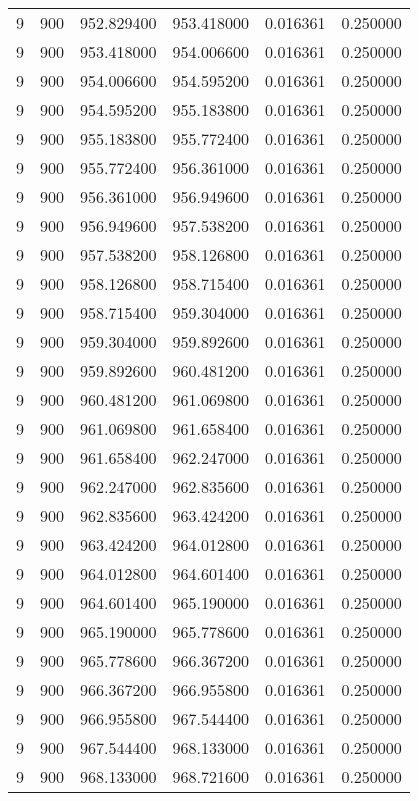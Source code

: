 \begin{longtable}{rrrrrr}
9 & 900 & 952.829400 & 953.418000 & 0.016361 & 0.250000 \\
9 & 900 & 953.418000 & 954.006600 & 0.016361 & 0.250000 \\
9 & 900 & 954.006600 & 954.595200 & 0.016361 & 0.250000 \\
9 & 900 & 954.595200 & 955.183800 & 0.016361 & 0.250000 \\
9 & 900 & 955.183800 & 955.772400 & 0.016361 & 0.250000 \\
9 & 900 & 955.772400 & 956.361000 & 0.016361 & 0.250000 \\
9 & 900 & 956.361000 & 956.949600 & 0.016361 & 0.250000 \\
9 & 900 & 956.949600 & 957.538200 & 0.016361 & 0.250000 \\
9 & 900 & 957.538200 & 958.126800 & 0.016361 & 0.250000 \\
9 & 900 & 958.126800 & 958.715400 & 0.016361 & 0.250000 \\
9 & 900 & 958.715400 & 959.304000 & 0.016361 & 0.250000 \\
9 & 900 & 959.304000 & 959.892600 & 0.016361 & 0.250000 \\
9 & 900 & 959.892600 & 960.481200 & 0.016361 & 0.250000 \\
9 & 900 & 960.481200 & 961.069800 & 0.016361 & 0.250000 \\
9 & 900 & 961.069800 & 961.658400 & 0.016361 & 0.250000 \\
9 & 900 & 961.658400 & 962.247000 & 0.016361 & 0.250000 \\
9 & 900 & 962.247000 & 962.835600 & 0.016361 & 0.250000 \\
9 & 900 & 962.835600 & 963.424200 & 0.016361 & 0.250000 \\
9 & 900 & 963.424200 & 964.012800 & 0.016361 & 0.250000 \\
9 & 900 & 964.012800 & 964.601400 & 0.016361 & 0.250000 \\
9 & 900 & 964.601400 & 965.190000 & 0.016361 & 0.250000 \\
9 & 900 & 965.190000 & 965.778600 & 0.016361 & 0.250000 \\
9 & 900 & 965.778600 & 966.367200 & 0.016361 & 0.250000 \\
9 & 900 & 966.367200 & 966.955800 & 0.016361 & 0.250000 \\
9 & 900 & 966.955800 & 967.544400 & 0.016361 & 0.250000 \\
9 & 900 & 967.544400 & 968.133000 & 0.016361 & 0.250000 \\
9 & 900 & 968.133000 & 968.721600 & 0.016361 & 0.250000 \\

\end{longtable}
